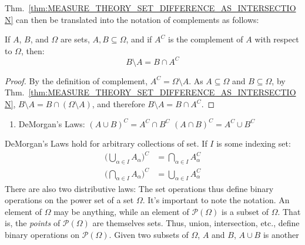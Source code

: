 \documentclass[crop=false,class=book,oneside]{standalone}
\begin{document}
            Thm.~\ref{thm:MEASURE_THEORY_SET_DIFFERENCE_AS_INTERSECTION} can then
            be translated into the notation of complements as follows:
            \begin{theorem}
                If $A$, $B$, and $\Omega$ are sets, $A,B\subseteq\Omega$,
                and if $A^{C}$ is the complement of $A$ with respect
                to $\Omega$, then:
                \begin{equation}
                    B\setminus{A}=B\cap{A}^{C}
                \end{equation}
            \end{theorem}
            \begin{proof}
                By the definition of complement, $A^{C}=\Omega\setminus{A}$.
                As $A\subseteq\Omega$ and $B\subseteq\Omega$, by
                Thm.~\ref{thm:MEASURE_THEORY_SET_DIFFERENCE_AS_INTERSECTION},
                $B\setminus{A}=B\cap(\Omega\setminus{A})$, and therefore
                $B\setminus{A}=B\cap{A}^{C}$.
            \end{proof}
            \begin{enumerate}
                \item DeMorgan's Laws:
                      \subitem $(A\cup{B})^{C}=A^{C}\cap{B}^{C}$
                      \subitem $(A\cap{B})^{C}=A^{C}\cup{B}^{C}$
            \end{enumerate}
            DeMorgan's Laws hold for arbitrary collections
            of set. If $I$ is some indexing set:
            \begin{align}
                \Big(\bigcup_{\alpha\in{I}}A_{\alpha}\Big)^{C}
                &=\bigcap_{\alpha\in{I}}A_{\alpha}^{C}\\
                \Big(\bigcap_{\alpha\in{I}}A_{\alpha}\Big)^{C}
                &=\bigcup_{\alpha\in{I}}A_{\alpha}^{C}
            \end{align}
            There are also two distributive laws:
            The set operations thus define binary operations
            on the power set of a set $\Omega$. It's important
            to note the notation. An element of $\Omega$ may
            be anything, while an element of
            $\mathcal{P}(\Omega)$ is a subset of $\Omega$.
            That is, the \textit{points} of $\mathcal{P}(\Omega)$
            are themselves sets. Thus, union, intersection,
            etc., define binary operations on
            $\mathcal{P}(\Omega)$. Given two subsets of
            $\Omega$, $A$ and $B$, $A\cup{B}$ is another
\end{document}
